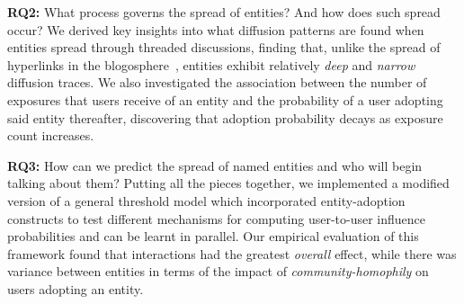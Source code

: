 \documentclass[sigconf]{acmart}
\begin{document}
 \textbf{RQ2:} What process governs the spread of entities? And how does such spread occur?
We derived key insights into what diffusion patterns are found when entities spread through threaded discussions,  finding that, unlike the spread of hyperlinks in the blogosphere~\cite{leskovec2007patterns}, entities exhibit relatively \emph{deep} and \emph{narrow} diffusion traces.
We also investigated the association between the number of exposures that users receive of an entity and the probability of a user adopting said entity thereafter, discovering that adoption probability decays as exposure count increases.

 \textbf{RQ3:} How can we predict the spread of named entities and who will begin talking about them?	
Putting all the pieces together, we implemented a modified version of a general threshold model which incorporated entity-adoption constructs to test different mechanisms for computing user-to-user influence probabilities and can be learnt in parallel.
Our empirical evaluation of this framework found that interactions had the greatest \emph{overall} effect, while there was variance between entities in terms of the impact of \emph{community-homophily} on users adopting an entity.

\end{document}

